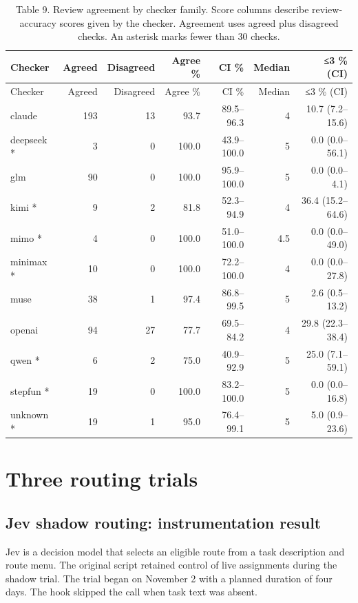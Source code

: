 \documentclass[
  10pt,
  a4paper,
]{article}
\begin{document}
\begin{longtable}[]{@{}lrrrrrr@{}}
\caption{Table 9. Review agreement by checker family. Score columns
describe review-accuracy scores given by the checker. Agreement uses
agreed plus disagreed checks. An asterisk marks fewer than 30
checks.}\tabularnewline
\toprule\noalign{}
Checker & Agreed & Disagreed & Agree \% & CI \% & Median & ≤3 \% (CI) \\
\midrule\noalign{}
\endfirsthead
\toprule\noalign{}
Checker & Agreed & Disagreed & Agree \% & CI \% & Median & ≤3 \% (CI) \\
\midrule\noalign{}
\endhead
\bottomrule\noalign{}
\endlastfoot
claude & 193 & 13 & 93.7 & 89.5--96.3 & 4 & 10.7 (7.2--15.6) \\
deepseek * & 3 & 0 & 100.0 & 43.9--100.0 & 5 & 0.0 (0.0--56.1) \\
glm & 90 & 0 & 100.0 & 95.9--100.0 & 5 & 0.0 (0.0--4.1) \\
kimi * & 9 & 2 & 81.8 & 52.3--94.9 & 4 & 36.4 (15.2--64.6) \\
mimo * & 4 & 0 & 100.0 & 51.0--100.0 & 4.5 & 0.0 (0.0--49.0) \\
minimax * & 10 & 0 & 100.0 & 72.2--100.0 & 4 & 0.0 (0.0--27.8) \\
muse & 38 & 1 & 97.4 & 86.8--99.5 & 5 & 2.6 (0.5--13.2) \\
openai & 94 & 27 & 77.7 & 69.5--84.2 & 4 & 29.8 (22.3--38.4) \\
qwen * & 6 & 2 & 75.0 & 40.9--92.9 & 5 & 25.0 (7.1--59.1) \\
stepfun * & 19 & 0 & 100.0 & 83.2--100.0 & 5 & 0.0 (0.0--16.8) \\
unknown * & 19 & 1 & 95.0 & 76.4--99.1 & 5 & 5.0 (0.9--23.6) \\
\end{longtable}

\section{Three routing trials}\label{three-routing-trials}

\subsection{Jev shadow routing: instrumentation
result}\label{jev-shadow-routing-instrumentation-result}

Jev is a decision model that selects an eligible route from a task
description and route menu. The original script retained control of live
assignments during the shadow trial. The trial began on November 2 with
a planned duration of four days. The hook skipped the call when task
text was absent.
\end{document}

